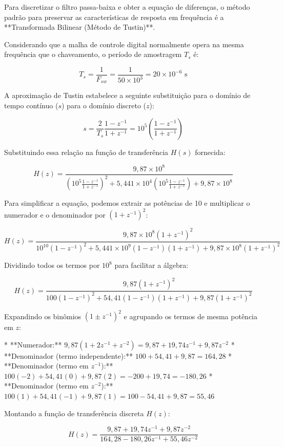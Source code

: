 Para discretizar o filtro passa-baixa e obter a equação de diferenças, o método padrão para preservar as características de resposta em frequência é a **Transformada Bilinear (Método de Tustin)**.

Considerando que a malha de controle digital normalmente opera na mesma frequência que o chaveamento, o período de amostragem $T_s$ é:

$$T_s = \frac{1}{F_{sw}} = \frac{1}{50 \times 10^3} = 20 \times 10^{-6} \text{ s}$$

A aproximação de Tustin estabelece a seguinte substituição para o domínio de tempo contínuo ($s$) para o domínio discreto ($z$):

$$s = \frac{2}{T_s} \frac{1 - z^{-1}}{1 + z^{-1}} = 10^5 \left( \frac{1 - z^{-1}}{1 + z^{-1}} \right)$$

Substituindo essa relação na função de transferência $H(s)$ fornecida:

$$H(z) = \frac{9{,}87 \times 10^8}{\left( 10^5 \frac{1 - z^{-1}}{1 + z^{-1}} \right)^2 + 5{,}441 \times 10^4 \left( 10^5 \frac{1 - z^{-1}}{1 + z^{-1}} \right) + 9{,}87 \times 10^8}$$

Para simplificar a equação, podemos extrair as potências de 10 e multiplicar o numerador e o denominador por $(1 + z^{-1})^2$:

$$H(z) = \frac{9{,}87 \times 10^8 (1 + z^{-1})^2}{10^{10} (1 - z^{-1})^2 + 5{,}441 \times 10^9 (1 - z^{-1})(1 + z^{-1}) + 9{,}87 \times 10^8 (1 + z^{-1})^2}$$

Dividindo todos os termos por $10^8$ para facilitar a álgebra:

$$H(z) = \frac{9{,}87 (1 + z^{-1})^2}{100 (1 - z^{-1})^2 + 54{,}41 (1 - z^{-1})(1 + z^{-1}) + 9{,}87 (1 + z^{-1})^2}$$

Expandindo os binômios $(1 \pm z^{-1})^2$ e agrupando os termos de mesma potência em $z$:

* **Numerador:** $9{,}87 (1 + 2z^{-1} + z^{-2}) = 9{,}87 + 19{,}74z^{-1} + 9{,}87z^{-2}$
* **Denominador (termo independente):** $100 + 54{,}41 + 9{,}87 = 164{,}28$
* **Denominador (termo em $z^{-1}$):** $100(-2) + 54{,}41(0) + 9{,}87(2) = -200 + 19{,}74 = -180{,}26$
* **Denominador (termo em $z^{-2}$):** $100(1) + 54{,}41(-1) + 9{,}87(1) = 100 - 54{,}41 + 9{,}87 = 55{,}46$

Montando a função de transferência discreta $H(z)$:

$$H(z) = \frac{9{,}87 + 19{,}74z^{-1} + 9{,}87z^{-2}}{164{,}28 - 180{,}26z^{-1} + 55{,}46z^{-2}}$$


